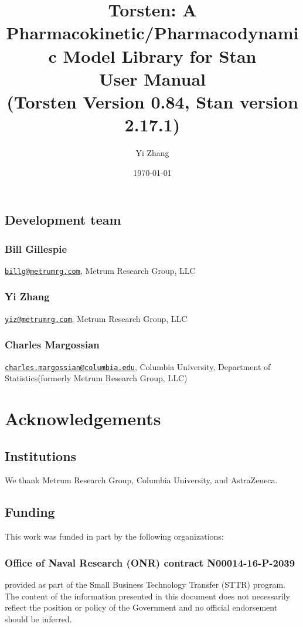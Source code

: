 \documentclass[11pt, reqno]{amsbook}
\author{Yi Zhang}
\date{\today}
\title{Torsten: A Pharmacokinetic/Pharmacodynamic Model Library for Stan\\\medskip
\large User Manual \\  (Torsten Version 0.84, Stan version 2.17.1)}
\numberwithin{section}{chapter}
\theoremstyle{remark}
\begin{document}
\maketitle
\tableofcontents


\section*{Development team}
\label{sec:org17a6f88}
\subsection*{Bill Gillespie}
\label{sec:orgd50f795}
\href{mailto:billg@metrumrg.com}{\texttt{billg@metrumrg.com}},
Metrum Research Group, LLC
\subsection*{Yi Zhang}
\label{sec:org63ec5f7}
\href{mailto:yiz@metrumrg.com}{\texttt{yiz@metrumrg.com}}, Metrum Research Group, LLC
\subsection*{Charles Margossian}
\label{sec:org875f835}
\href{mailto:charles.margossian@columbia.edu}{\texttt{charles.margossian@columbia.edu}}, Columbia University, Department of Statistics(formerly Metrum Research Group, LLC)

\chapter*{Acknowledgements}
\label{sec:orgf5f9ef5}
\section*{Institutions}
\label{sec:orgb44ca31}
We thank Metrum Research Group, Columbia University, and AstraZeneca.
\section*{Funding}
\label{sec:org40275d1}
This work was funded in part by the following organizations:
\subsection*{Office of Naval Research (ONR) contract N00014-16-P-2039}
\label{sec:orgd64c73d}
provided as part of the Small Business Technology Transfer (STTR)
program. The content of the information presented in this document
does not necessarily reflect the position or policy of the
Government and no official endorsement should be inferred.
\end{document}
